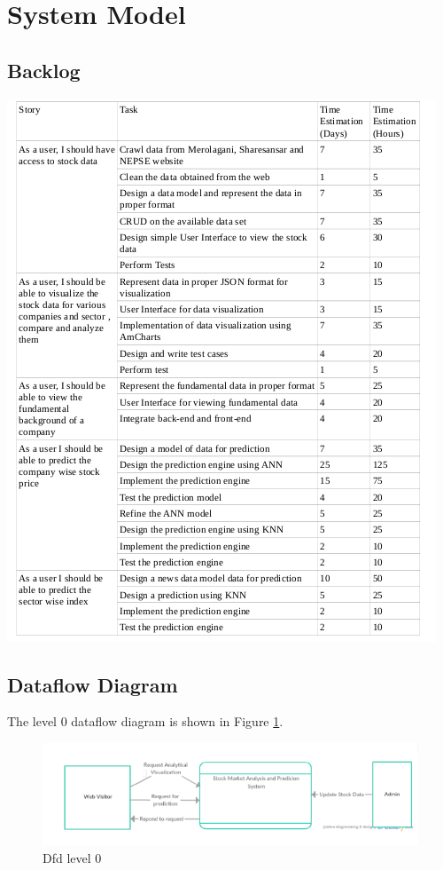 \newpage
\section{System Model}
\subsection{Backlog}
\includegraphics{fig/backlog.png}\\[0.2cm]
\subsection{Dataflow Diagram}
The level 0 dataflow diagram is shown in Figure \ref{fig:dfd0}.
\begin{figure}[h!]
  \includegraphics[width=6in]{fig/dfd0}
  \caption{Dfd level 0 }\label{fig:dfd0}
\end{figure}

